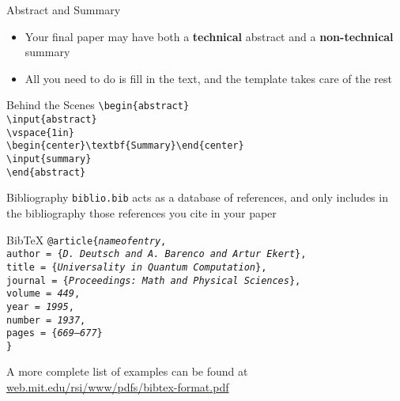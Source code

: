 \begin{frame}{Abstract and Summary}
\begin{itemize}
\item Your final paper may have both a \textbf{technical} abstract and a \textbf{non-technical} summary
\item All you need to do is fill in the text, and the template takes care of the rest
\end{itemize}
\begin{block}{Behind the Scenes}
\hspace{1cm}\texttt{\textbackslash begin\{abstract\} \\
\hspace{1.5cm}\textbackslash input\{abstract\} \\
\hspace{1.5cm}\textbackslash vspace\{1in\} \\
\hspace{1.5cm}\textbackslash begin\{center\}\textbackslash textbf\{Summary\}\textbackslash end\{center\} \\
\hspace{1.5cm}\textbackslash input\{summary\} \\
\hspace{1cm}\textbackslash end\{abstract\}}
\end{block}
\end{frame}

\begin{frame}{Bibliography}
\texttt{biblio.bib} acts as a database of references, and only includes in the bibliography those references you cite in your paper
\begin{block}{Bib\TeX}
{\small\texttt{@article\{\emph{nameofentry}, \\
\hspace{0.5cm}author = \{\emph{D. Deutsch and A. Barenco and Artur Ekert}\}, \\
\hspace{0.5cm}title = \{\emph{Universality in Quantum Computation}\}, \\
\hspace{0.5cm}journal = \{\emph{Proceedings: Math and Physical Sciences}\}, \\
\hspace{0.5cm}volume = \emph{449}, \\
\hspace{0.5cm}year = \emph{1995}, \\
\hspace{0.5cm}number = \emph{1937}, \\
\hspace{0.5cm}pages = \{\emph{669--677}\} \\
\}}}
\end{block}
A more complete list of examples can be found at \url{web.mit.edu/rsi/www/pdfs/bibtex-format.pdf}
\end{frame}

